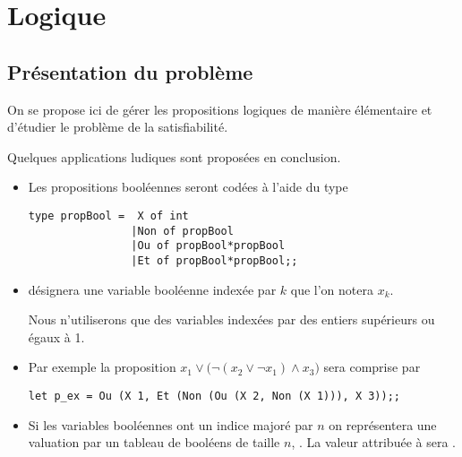 \chapter{Logique}
\thispagestyle{empty}
\section{Présentation du problème}
On se propose ici de gérer les propositions logiques de manière élémentaire et d'étudier le problème de la satisfiabilité.

Quelques applications ludiques sont proposées en conclusion.

\begin{itemize}
  \item Les propositions booléennes seront codées à l'aide du type

\begin{lstlisting}
type propBool =  X of int
                |Non of propBool
                |Ou of propBool*propBool
                |Et of propBool*propBool;;
\end{lstlisting}


\item {} désignera une variable booléenne indexée par $k$ que l'on notera $x_k$.

Nous n'utiliserons que des variables indexées par des entiers supérieurs ou égaux à 1.

\item Par exemple la proposition $x_1 \lor \bigl(\lnot (x_2 \lor \lnot x_1) \land x_3\bigr)$ sera comprise par

\begin{lstlisting}
let p_ex = Ou (X 1, Et (Non (Ou (X 2, Non (X 1))), X 3));;
\end{lstlisting}

\item Si les variables booléennes ont un indice majoré par $n$ on représentera une valuation par un tableau de booléens de taille $n$, . La valeur attribuée à  sera . 
\end{itemize}

